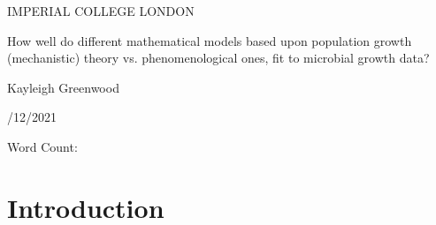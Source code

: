 \documentclass[11pt, titlepage]{article}
\newcommand{\wordcount}{}
\begin{document}
    \begin{titlepage}
    \begin{center}
            {\large IMPERIAL COLLEGE LONDON}
    \end{center}
    
    \vspace*{\fill}
    
    \begin{center}
        {\Huge How well do different mathematical models based upon population growth (mechanistic) theory vs. phenomenological ones, fit to microbial growth data?}
    
        \bigskip
        Kayleigh Greenwood

        /12/2021

        \bigskip
        Word Count:
        \wordcount

    \end{center}
    
    \vspace{\fill}
    
    \end{titlepage}

    \begin{abstract}
	Microbial growth rates are important to understand in the context of food safety. The standard method for growth prediction used to be null hypothesis testing, however an increasingly popular alternative is mathematical modelling. Both empirical and mechanistic models have been used throughout the literature for modelling microbial growth. I used an existing database to model microbial growth rate data in this study. To test the suitability of empirical and mechanistic models for microbial growth rate studies, I used a cubic polynomial and the logistic model. The Logistic model had the lowest significant AIC values, and most often had the lowest RSS, for the most subsets. From these two selection criteria, the statistics suggest that the mechanistic logistic model both fits microbial growth curves better, explains more of the error, and is more likely to be a correct prediction than the polynomial model. Although these criteria suggest that  mechanistic model would be better for forecasting, larger sample sizes and repeated studies should be undertaken with a wider range of statistical analysis in order to further aid the future of model fitting. 
    \end{abstract}

    \section*{Introduction}
    
\end{document}
